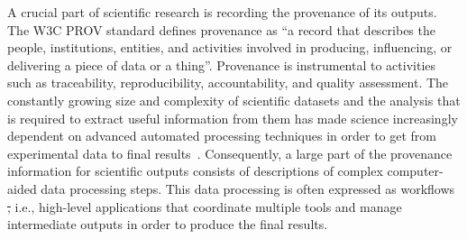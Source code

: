 \documentclass[10pt,letterpaper]{article}
\providecommand{\DIFaddtex}[1]{{\protect\color{blue}\uwave{#1}}} %
\providecommand{\DIFdeltex}[1]{{\protect\color{red}\sout{#1}}}                      %
\providecommand{\DIFaddbegin}{} %
\providecommand{\DIFaddend}{} %
\providecommand{\DIFdelbegin}{} %
\providecommand{\DIFdelend}{} %
\providecommand{\DIFadd}[1]{\texorpdfstring{\DIFaddtex{#1}}{#1}} %
\providecommand{\DIFdel}[1]{\texorpdfstring{\DIFdeltex{#1}}{}} %
\newcommand{\DIFscaledelfig}{0.5}
\newlength{\DIFdelgraphicswidth} %
\newlength{\DIFdelgraphicsheight} %
\newcommand{\DIFaddincludegraphics}[2][]{{\color{blue}\fbox{\DIFOincludegraphics[#1]{#2}}}} %
\newcommand{\DIFdelincludegraphics}[2][]{%
\sbox{\DIFdelgraphicsbox}{\DIFOincludegraphics[#1]{#2}}%
\settoboxwidth{\DIFdelgraphicswidth}{\DIFdelgraphicsbox} %
\settoboxtotalheight{\DIFdelgraphicsheight}{\DIFdelgraphicsbox} %
\scalebox{\DIFscaledelfig}{%
\parbox[b]{\DIFdelgraphicswidth}{\usebox{\DIFdelgraphicsbox}\\[-\baselineskip] \rule{\DIFdelgraphicswidth}{0em}}\llap{\resizebox{\DIFdelgraphicswidth}{\DIFdelgraphicsheight}{%
\setlength{\unitlength}{\DIFdelgraphicswidth}%
\begin{picture}(1,1)%
\thicklines\linethickness{2pt} %
{\color[rgb]{1,0,0}\put(0,0){\framebox(1,1){}}}%
{\color[rgb]{1,0,0}\put(0,0){\line( 1,1){1}}}%
{\color[rgb]{1,0,0}\put(0,1){\line(1,-1){1}}}%
\end{picture}%
}\hspace*{3pt}}} %
} %
\DeclareRobustCommand{\DIFaddbegin}{\DIFOaddbegin \let\includegraphics\DIFaddincludegraphics} %
\DeclareRobustCommand{\DIFaddend}{\DIFOaddend \let\includegraphics\DIFOincludegraphics} %
\DeclareRobustCommand{\DIFdelbegin}{\DIFOdelbegin \let\includegraphics\DIFdelincludegraphics} %
\DeclareRobustCommand{\DIFdelend}{\DIFOaddend \let\includegraphics\DIFOincludegraphics} %
\begin{document}
A crucial part of scientific research is recording the provenance of its outputs.
The W3C PROV standard defines provenance as ``a record that describes the people, institutions, entities, and activities involved in producing, influencing, or delivering a piece of data or a thing''\DIFaddbegin \DIFadd{~}\DIFaddend \cite{Moreau 2013}.
Provenance is instrumental to activities such as traceability, reproducibility,
accountability, and quality assessment\DIFaddbegin \DIFadd{~}\DIFaddend \cite{Herschel 2017}.
The constantly growing size and complexity of scientific datasets and the analysis that is required to extract useful information from them has made science increasingly dependent on advanced automated processing techniques in order to get from experimental data to final results~\cite{Himanen 2019, Gauthier 2019, Huntingford 2019}.
Consequently, a large part of the provenance information for scientific outputs consists of descriptions of complex computer-aided data processing steps. This data processing is often expressed as workflows \DIFdelbegin \DIFdel{, }\DIFdelend \DIFaddbegin \DIFadd{-- }\DIFaddend i.e., high-level applications that coordinate multiple tools and manage intermediate outputs in order to produce the final results.
\end{document}
